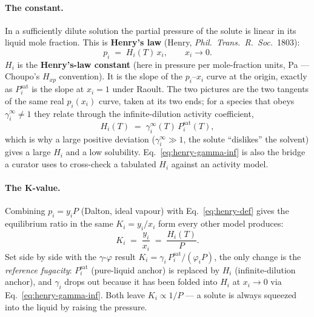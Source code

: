 \documentclass[11pt,a4paper]{article}
\newcommand{\Psat}{P^{\mathrm{sat}}}
\begin{document}
\paragraph{The constant.}  In a sufficiently dilute solution the
partial pressure of the solute is linear in its liquid mole fraction.
This is \textbf{Henry's law} (Henry, \emph{Phil.\ Trans.\ R.\ Soc.}\
1803):
\begin{equation}
   \boxed{\;
   p_i \;=\; H_i(T)\,x_i,
   \qquad x_i \to 0.
   \;}
   \label{eq:henry-def}
\end{equation}
$H_i$ is the \textbf{Henry's-law constant} (here in pressure
per mole-fraction units, Pa --- Choupo's $H_{xp}$ convention).  It is
the slope of the $p_i$--$x_i$ curve at the origin, exactly as $\Psat_i$
is the slope at $x_i = 1$ under Raoult.  The two pictures are the two
tangents of the same real $p_i(x_i)$ curve, taken at its two ends; for
a species that obeys $\gamma_i^\infty \neq 1$ they relate through the
infinite-dilution activity coefficient,
\begin{equation}
   H_i(T) \;=\; \gamma_i^{\infty}(T)\,\Psat_i(T),
   \label{eq:henry-gamma-inf}
\end{equation}
which is why a large positive deviation ($\gamma_i^\infty \gg 1$, the
solute ``dislikes'' the solvent) gives a large $H_i$ and a low
solubility.  Eq.~\eqref{eq:henry-gamma-inf} is also the bridge a
curator uses to cross-check a tabulated $H_i$ against an activity
model.

\paragraph{The K-value.}  Combining $p_i = y_i P$ (Dalton, ideal
vapour) with Eq.~\eqref{eq:henry-def} gives the equilibrium ratio in
the same $K_i = y_i/x_i$ form every other model produces:
\begin{equation}
   \boxed{\;
   K_i \;=\; \frac{y_i}{x_i} \;=\; \frac{H_i(T)}{P}.
   \;}
   \label{eq:henry-K}
\end{equation}
Set side by side with the $\gamma$-$\varphi$ result $K_i =
\gamma_i\,\Psat_i/(\varphi_i P)$, the only change is the
\emph{reference fugacity}: $\Psat_i$ (pure-liquid anchor) is replaced
by $H_i$ (infinite-dilution anchor), and $\gamma_i$ drops out because
it has been folded into $H_i$ at $x_i \to 0$ via
Eq.~\eqref{eq:henry-gamma-inf}.  Both leave $K_i \propto 1/P$ --- a
solute is always squeezed into the liquid by raising the pressure.
\end{document}

